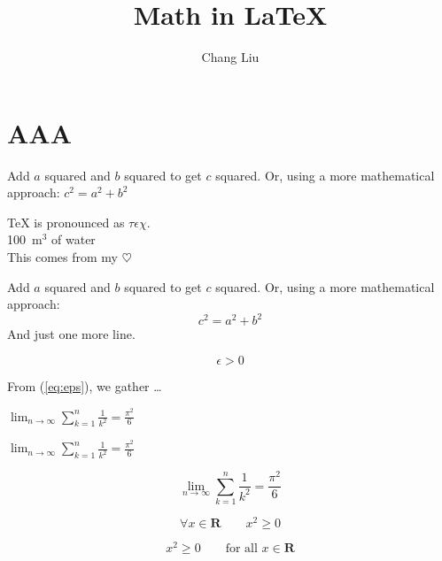 \documentclass{article}
\author{Chang Liu}
\title{Math in \LaTeX{}}
\begin{document}
\maketitle

\newpage


\section{AAA}

Add $a$ squared and $b$ squared
to get $c$ squared. Or, using
a more mathematical approach:
$c^{2}=a^{2}+b^{2}$


\TeX{} is pronounced as
$\tau\epsilon\chi$.\\[6pt]
100~m$^{3}$ of water\\[6pt]
This comes from my $\heartsuit$

Add $a$ squared and $b$ squared
to get $c$ squared. Or, using
a more mathematical approach:
\begin{displaymath}
c^{2}=a^{2}+b^{2}
\end{displaymath}
And just one more line.

\begin{equation} \label{eq:eps} %
\epsilon > 0
\end{equation}

From (\ref{eq:eps}), we gather \ldots %


$\lim_{n \to \infty}
\sum_{k=1}^n \frac{1}{k^2}
= \frac{\pi^2}{6}$


$\lim_{n \to \infty}\sum_{k=1}^n \frac{1}{k^2} = \frac{\pi^2}{6}$ %

\begin{displaymath}
\lim_{n \to \infty}
\sum_{k=1}^n \frac{1}{k^2}
= \frac{\pi^2}{6}
\end{displaymath}


\begin{equation}
\forall x \in \mathbf{R} %
\qquad x^2 \geq 0 %
\end{equation}

\begin{equation}
x^{2} \geq 0\qquad
\textrm{for all }x\in\mathbf{R}
\end{equation}
\end{document}
